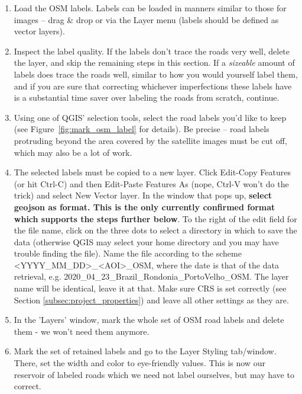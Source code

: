 \documentclass[12pt,a4paper]{scrartcl}
\begin{document}
\begin{enumerate}
	\item Load the OSM labels. Labels can be loaded in manners similar to those for images -- drag \& drop or via the Layer menu (labels should be defined as vector layers).
	\item Inspect the label quality. If the labels don't trace the roads very well, delete the layer, and skip the remaining steps in this section. If a \textit{sizeable} amount of labels does trace the roads well, similar to how you would yourself label them, and if you are sure that correcting whichever imperfections these labels have is a substantial time saver over labeling the roads from scratch, continue.
	\item Using one of QGIS' selection tools, select the road labels you'd like to keep (see Figure~\ref{fig:mark_osm_label} for details). Be precise -- road labels protruding beyond the area covered by the satellite images must be cut off, which may also be a lot of work.
	\item The selected labels must be copied to a new layer. Click Edit-Copy Features (or hit Ctrl-C) and then Edit-Paste Features As (nope, Ctrl-V won't do the trick) and select New Vector layer. In the window that pops up, \textbf{select geojson as format. This is the only currently confirmed format which supports the steps further below}. To the right of the edit field for the file name, click on the three dots to select a directory in which to save the data (otherwise QGIS may select your home directory and you may have trouble finding the file). Name the file according to the scheme <YYYY\_MM\_DD>\_<AOI>\_OSM, where the date is that of the data retrieval, e.g. 2020\_04\_23\_Brazil\_Rondonia\_PortoVelho\_OSM. The layer name will be identical, leave it at that. Make sure CRS is set correctly (see Section \ref{subsec:project_properties}) and leave all other settings as they are.
	\item In the 'Layers' window, mark the whole set of OSM road labels and delete them - we won't need them anymore.
	\item Mark the set of retained labels and go to the Layer Styling tab/window. There, set the width and color to eye-friendly values. This is now our reservoir of labeled roads which we need not label ourselves, but may have to correct.
\end{enumerate}
\end{document}
